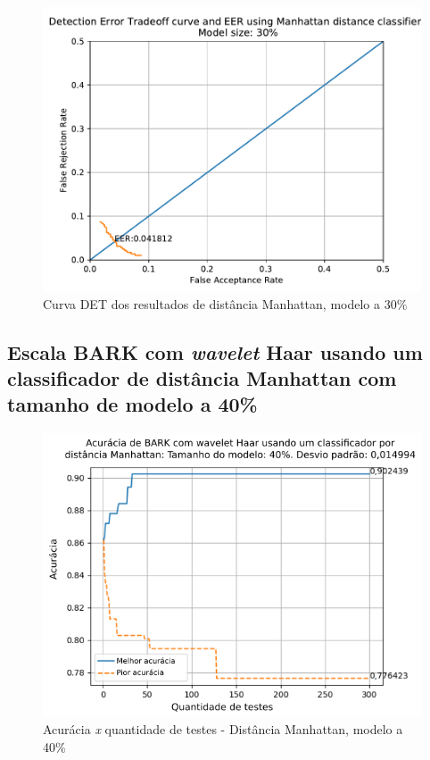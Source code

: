 			\begin{figure}[!ht]
				\centering
				\includegraphics[width=.6\linewidth]{images/results/det/DET_for_classifier_Manhattan_30}
				\caption{Curva DET dos resultados de distância Manhattan, modelo a 30\%}
				\label{fig:detforclassifiermanhattan30}
			\end{figure}
			
			\FloatBarrier
		\subsection{Escala BARK com \textit{wavelet} Haar usando um classificador de distância Manhattan com tamanho de modelo a 40\%}
		
			
			
			\begin{figure}[!ht]
				\centering
				\includegraphics[width=.6\linewidth]{images/results/confusionMatrices/classifier_Manhattan_40.png}
				\caption{Acurácia \textit{x} quantidade de testes - Distância Manhattan, modelo a 40\%}
				\label{fig:classifiermanhattan40}
			\end{figure}
		
